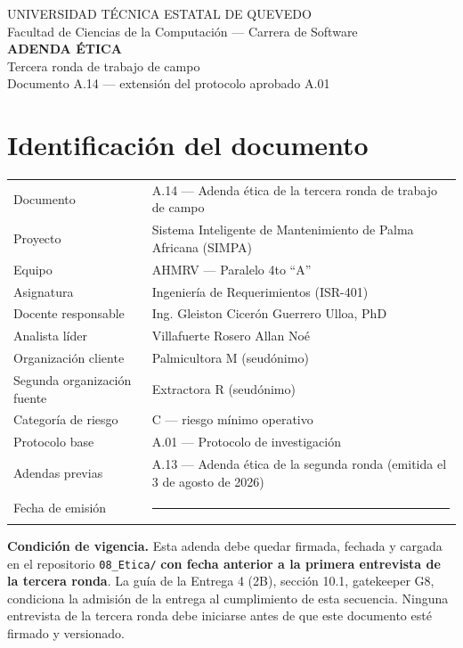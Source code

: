 \documentclass[11pt,a4paper]{article}
\begin{document}
\begin{center}
{\footnotesize UNIVERSIDAD TÉCNICA ESTATAL DE QUEVEDO\\
Facultad de Ciencias de la Computación --- Carrera de Software}\\[10pt]
{\Large\bfseries\color{uteqverde} ADENDA ÉTICA}\\[3pt]
{\large Tercera ronda de trabajo de campo}\\[2pt]
{\footnotesize Documento A.14 --- extensión del protocolo aprobado A.01}
\end{center}

\vspace{6pt}

\section*{Identificación del documento}
\renewcommand{\arraystretch}{1.25}
\begin{longtable}{|L{5.0cm}|L{10.6cm}|}
\hline
{}\\
\hline
Documento & A.14 --- Adenda ética de la tercera ronda de trabajo de campo \\
\hline
Proyecto & Sistema Inteligente de Mantenimiento de Palma Africana (SIMPA) \\
\hline
Equipo & AHMRV --- Paralelo 4to ``A'' \\
\hline
Asignatura & Ingeniería de Requerimientos (ISR-401) \\
\hline
Docente responsable & Ing. Gleiston Cicerón Guerrero Ulloa, PhD \\
\hline
Analista líder & Villafuerte Rosero Allan Noé \\
\hline
Organización cliente & Palmicultora M (seudónimo) \\
\hline
Segunda organización fuente & Extractora R (seudónimo) \\
\hline
Categoría de riesgo & C --- riesgo mínimo operativo \\
\hline
Protocolo base & A.01 --- Protocolo de investigación \\
\hline
Adendas previas & A.13 --- Adenda ética de la segunda ronda (emitida el 3 de agosto de 2026) \\
\hline
Fecha de emisión & \rule{5.5cm}{0.4pt} \\
\hline
\end{longtable}

\begin{tcolorbox}[colback=red!4,colframe=red!55!black,boxrule=0.8pt,arc=2pt,left=6pt,right=6pt,top=5pt,bottom=5pt]
\textbf{Condición de vigencia.} Esta adenda debe quedar firmada, fechada y cargada en el repositorio
\texttt{08\_Etica/} \textbf{con fecha anterior a la primera entrevista de la tercera ronda}. La guía de la
Entrega 4 (2B), sección 10.1, gatekeeper G8, condiciona la admisión de la entrega al cumplimiento de esta
secuencia. Ninguna entrevista de la tercera ronda debe iniciarse antes de que este documento esté firmado y
versionado.
\end{tcolorbox}
\end{document}
